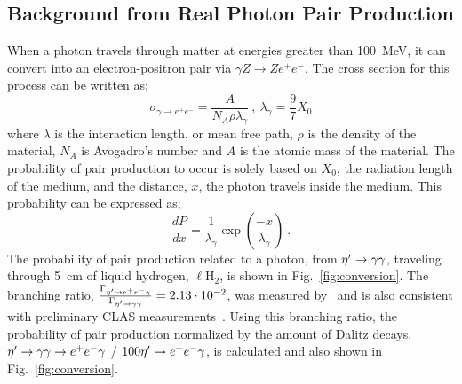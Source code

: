 \subsection{Background from Real Photon Pair Production}\label{sec:intro.conversion}
When a photon travels through matter at energies greater than 100~MeV, it can convert into an electron-positron pair via $\gamma Z \rightarrow Ze^{+}e^{-}$. The cross section for this process can be written as;
\begin{equation}\label{pair_crosssection}
\sigma_{\gamma\rightarrow e^+e^-} =  \frac{A}{N_{A} \rho \lambda_\gamma}  \ ,\ \lambda_\gamma = \frac{9}{7}X_0
\end{equation}
where $\lambda$ is the interaction length, or mean free path, $\rho$ is the density of the material, $N_A$ is Avogadro's number and $A$ is the atomic mass of the material. The probability of pair production to occur is solely based on $X_{0}$, the radiation length of the medium, and the distance, $x$, the photon travels inside the medium. This probability can be expressed as;
\begin{equation}
\frac{dP}{dx} = \frac{1}{\lambda_\gamma}\exp(\frac{-x}{\lambda_\gamma}) \ .
\end{equation}
%
%
The probability of pair production related to a photon, from $\eta^{\prime} \to \gamma \gamma$, traveling through 5~cm of liquid hydrogen, $\ell$H$_2$, is shown in Fig.~\ref{fig:conversion}.
The branching ratio, $\frac{\Gamma_{\eta^{\prime} \to e^+e^- \gamma}}{\Gamma_{\eta^{\prime} \to \gamma \gamma}} = 2.13\cdot 10^{-2}$, was measured by~\cite{BESIII} and is also consistent with preliminary CLAS measurements~\cite{claskunkel}.
Using this branching ratio, the probability of pair production normalized by the amount of Dalitz decays,  $\eta^{\prime} \to \gamma \gamma \rightarrow e^+e^- \gamma$ / $100 \eta^{\prime} \rightarrow e^+e^- \gamma$, is calculated and also shown in Fig.~\ref{fig:conversion}. 
